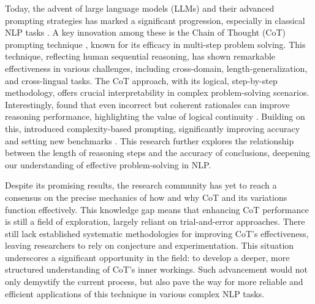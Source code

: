 \documentclass[11pt]{article}
\begin{document}
Today, the advent of large language models (LLMs) and their advanced prompting strategies has marked a significant progression, especially in classical NLP tasks \cite{kojima2023large,wei2022chain,shao2023synthetic,lyu2023faithful, jin2024exploring}. A key innovation among these is the Chain of Thought (CoT) prompting technique \cite{kojima2023large,wang2023selfconsistency,zhang2022automatic}, known for its efficacy in multi-step problem solving. This technique, reflecting human sequential reasoning, has shown remarkable effectiveness in various challenges, including cross-domain, length-generalization, and cross-lingual tasks. The CoT approach, with its logical, step-by-step methodology, offers crucial interpretability in complex problem-solving scenarios. Interestingly, \citeauthor{wang2023selfconsistency} found that even incorrect but coherent rationales can improve reasoning performance, highlighting the value of logical continuity \cite{wang2023selfconsistency}. Building on this, \citeauthor{fu2023complexitybased} introduced complexity-based prompting, significantly improving accuracy and setting new benchmarks \cite{fu2023complexitybased}. This research further explores the relationship between the length of reasoning steps and the accuracy of conclusions, deepening our understanding of effective problem-solving in NLP.

Despite its promising results, the research community has yet to reach a consensus on the precise mechanics of how and why CoT and its variations function effectively. This knowledge gap means that enhancing CoT performance is still a field of exploration, largely reliant on trial-and-error approaches. There still lack established systematic methodologies for improving CoT's effectiveness, leaving researchers to rely on conjecture and experimentation. This situation underscores a significant opportunity in the field: to develop a deeper, more structured understanding of CoT's inner workings. Such advancement would not only demystify the current process, but also pave the way for more reliable and efficient applications of this technique in various complex NLP tasks.
\end{document}
